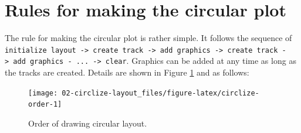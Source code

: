 \documentclass[]{book}
\begin{document}
\section{Rules for making the circular
plot}\label{rules-for-making-the-circular-plot}

The rule for making the circular plot is rather simple. It follows the
sequence of
\texttt{initialize\ layout\ -\textgreater{}\ create\ track\ -\textgreater{}\ add\ graphics\ -\textgreater{}\ create\ track\ -\textgreater{}\ add\ graphics\ -\ ...\ -\textgreater{}\ clear}.
Graphics can be added at any time as long as the tracks are created.
Details are shown in Figure \ref{fig:circlize-order} and as follows:

\begin{figure}

{\centering \texttt{[image: 02-circlize-layout\_files/figure-latex/circlize-order-1]} 

}

\caption{Order of drawing circular layout.}\label{fig:circlize-order}
\end{figure}
\end{document}
